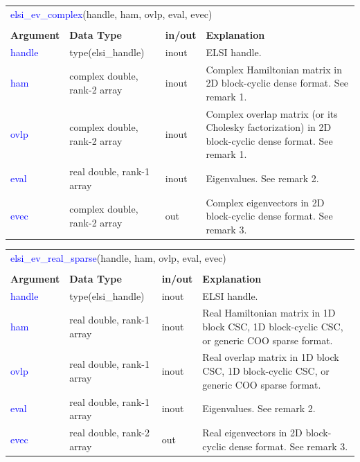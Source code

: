 \documentclass{report}
\newcommand{\tcb}[1]{\textcolor{blue}{#1}}
\begin{document}
\begin{tabular}[]{|p{20mm}|p{45mm}|p{15mm}|p{85mm}|}
\multicolumn{4}{l}{\tcb{elsi\_ev\_complex}(handle, ham, ovlp, eval, evec)}\\
\multicolumn{4}{l}{}\\
\hline
\multicolumn{1}{|l|}{\textbf{Argument}} & \multicolumn{1}{l|}{\textbf{Data Type}} & \multicolumn{1}{l|}{\textbf{in/out}} & \multicolumn{1}{l|}{\textbf{Explanation}}\\
\hline
\tcb{handle} & type(elsi\_handle)           & inout & ELSI handle.\\
\hline
\tcb{ham}    & complex double, rank-2 array & inout & Complex Hamiltonian matrix in 2D block-cyclic dense format. See remark 1.\\
\hline
\tcb{ovlp}   & complex double, rank-2 array & inout & Complex overlap matrix (or its Cholesky factorization) in 2D block-cyclic dense format. See remark 1.\\
\hline
\tcb{eval}   & real double, rank-1 array    & inout & Eigenvalues. See remark 2.\\
\hline
\tcb{evec}   & complex double, rank-2 array & out   & Complex eigenvectors in 2D block-cyclic dense format. See remark 3.\\
\hline
\end{tabular}

\begin{tabular}[]{|p{20mm}|p{45mm}|p{15mm}|p{85mm}|}
\multicolumn{4}{l}{\tcb{elsi\_ev\_real\_sparse}(handle, ham, ovlp, eval, evec)}\\
\multicolumn{4}{l}{}\\
\hline
\multicolumn{1}{|l|}{\textbf{Argument}} & \multicolumn{1}{l|}{\textbf{Data Type}} & \multicolumn{1}{l|}{\textbf{in/out}} & \multicolumn{1}{l|}{\textbf{Explanation}}\\
\hline
\tcb{handle} & type(elsi\_handle)        & inout & ELSI handle.\\
\hline
\tcb{ham}    & real double, rank-1 array & inout & Real Hamiltonian matrix in 1D block CSC, 1D block-cyclic CSC, or generic COO sparse format.\\
\hline
\tcb{ovlp}   & real double, rank-1 array & inout & Real overlap matrix in 1D block CSC, 1D block-cyclic CSC, or generic COO sparse format.\\
\hline
\tcb{eval}   & real double, rank-1 array & inout & Eigenvalues. See remark 2.\\
\hline
\tcb{evec}   & real double, rank-2 array & out   & Real eigenvectors in 2D block-cyclic dense format. See remark 3.\\
\hline
\end{tabular}
\end{document}
